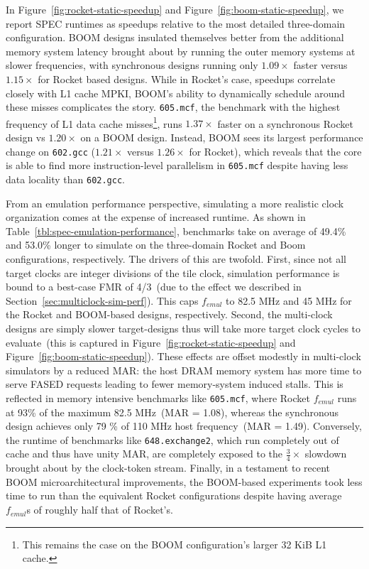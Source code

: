 In Figure~\ref{fig:rocket-static-speedup} and Figure~\ref{fig:boom-static-speedup}, we report
SPEC runtimes as speedups relative to the most detailed three-domain
configuration. BOOM designs insulated themselves better from the additional
memory system latency brought about by running the outer memory systems at
slower frequencies, with synchronous designs running only $1.09\times$ faster
versus $1.15\times$ for Rocket based designs. While in Rocket's case, speedups
correlate closely with L1 cache MPKI, BOOM's ability to dynamically schedule
around these misses complicates the story. \texttt{605.mcf}, the benchmark with
the highest frequency of L1 data cache misses\footnote{This remains the case on
the BOOM configuration's larger 32 KiB L1 cache.}, runs $1.37\times$ faster on a synchronous Rocket
design vs $1.20\times$ on a BOOM design. Instead, BOOM sees its largest
performance change on \texttt{602.gcc} ($1.21\times$ versus $1.26\times$ for
Rocket), which reveals that the core is able to find more instruction-level parallelism in \texttt{605.mcf}
despite having less data locality than \texttt{602.gcc}.



From an emulation performance perspective, simulating a more realistic clock
organization comes at the expense of increased runtime. As shown in
Table~\ref{tbl:spec-emulation-performance}, benchmarks take on average of 49.4\%
and 53.0\% longer to simulate on the three-domain Rocket and Boom
configurations, respectively. The drivers of this are twofold. First, since
not all target clocks are integer divisions of the tile clock, simulation
performance is bound to a best-case FMR of 4/3~(due to the effect we described in
Section~\ref{sec:multiclock-sim-perf}). This caps $f_{emul}$ to 82.5 MHz and
45 MHz for the Rocket and BOOM-based designs, respectively. Second, the
multi-clock designs are simply slower target-designs thus will take more target clock
cycles to evaluate~(this is captured in Figure~\ref{fig:rocket-static-speedup}
and Figure~\ref{fig:boom-static-speedup}). These effects are offset modestly in
multi-clock
simulators by a reduced MAR: the host DRAM memory system has more time to serve
FASED requests leading to fewer memory-system induced stalls. This is reflected in memory intensive benchmarks like
\texttt{605.mcf}, where Rocket $f_{emul}$ runs at 93\% of the maximum 82.5
MHz~(MAR = 1.08), whereas the synchronous design achieves only 79 \% of 110 MHz
host frequency~(MAR = 1.49). Conversely, the runtime of benchmarks like
\texttt{648.exchange2}, which run completely out of cache and thus have unity MAR, are
completely exposed to the $\frac{3}{4}\times$ slowdown brought about by the clock-token
stream. Finally, in a testament to recent BOOM microarchitectural improvements,
the BOOM-based experiments took less time to run than the equivalent Rocket
configurations despite having average $f_{emul}$s of roughly half that of
Rocket's.


